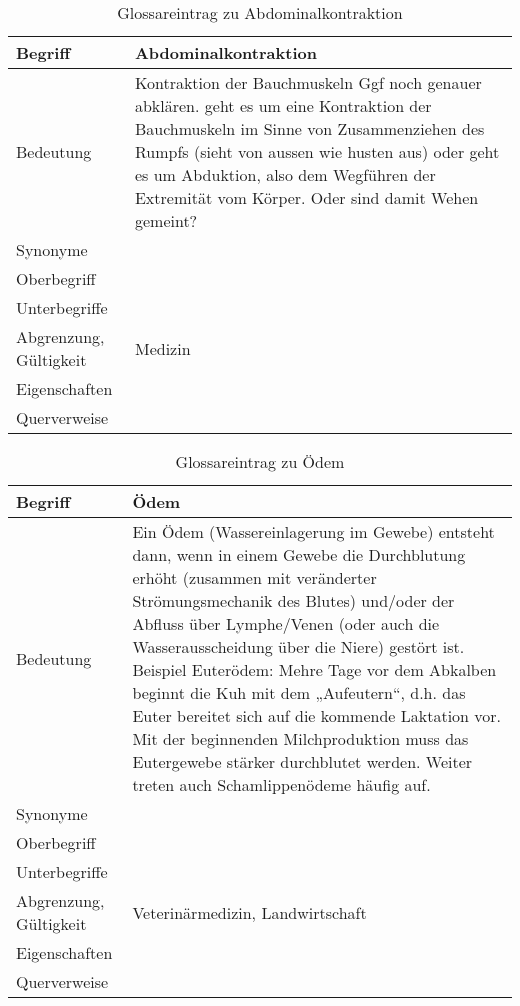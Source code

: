 \begin{table}[h]
	\centering	
	\begin{tabular}{ p{4.5cm} p{10.5cm} } 
		\toprule[1pt]
		\rowcolor{maroon!30}
		
		\textbf{Begriff} &  \textbf{Abdominalkontraktion} \\		
		\midrule
		
		Bedeutung  & Kontraktion  der Bauchmuskeln \cellcolor[RGB]{255, 255, 0} Ggf noch genauer abklären. geht es um eine Kontraktion der Bauchmuskeln im Sinne von Zusammenziehen des Rumpfs (sieht von aussen wie husten aus) oder geht es um Abduktion, also dem Wegführen der Extremität vom Körper. Oder sind damit Wehen gemeint? \\		
		Synonyme  & \\				
		Oberbegriff  &  \\		
		Unterbegriffe   &\\		
		Abgrenzung, Gültigkeit  & Medizin\\				
		Eigenschaften  & \\				
		Querverweise  & \\	
		\bottomrule				
		
	\end{tabular}
	\label{tab: Glossareintrag zu Abdominalkontraktion}
	\caption{Glossareintrag zu Abdominalkontraktion}
\end{table}


\begin{table}[h]
	\centering	
	\begin{tabular}{ p{4.5cm} p{10.5cm} } 
		\toprule[1pt]
		\rowcolor{maroon!30}
		
		\textbf{Begriff} &  \textbf{Ödem} \\
		\midrule
				
		Bedeutung  & Ein Ödem (Wassereinlagerung im Gewebe) entsteht dann, wenn in einem Gewebe die Durchblutung erhöht (zusammen mit veränderter Strömungsmechanik des Blutes)  und/oder der Abfluss über Lymphe/Venen (oder auch die Wasserausscheidung über die Niere) gestört ist.
		Beispiel Euterödem: Mehre Tage vor dem Abkalben beginnt die Kuh mit dem „Aufeutern“, d.h. das Euter bereitet sich auf die kommende Laktation vor. Mit der beginnenden Milchproduktion muss das Eutergewebe stärker durchblutet werden. \cite{Swissgenetics} Weiter treten auch Schamlippenödeme häufig auf.\\		
		Synonyme  &  \\			
		Oberbegriff  &  \\		
		Unterbegriffe   & \\		
		Abgrenzung, Gültigkeit  & Veterinärmedizin, Landwirtschaft\\				
		Eigenschaften  & \\				
		Querverweise  & \\	
		\bottomrule				
		
	\end{tabular}
	\label{tab: Glossareintrag zu Ödem}
	\caption{Glossareintrag zu Ödem}
\end{table}

